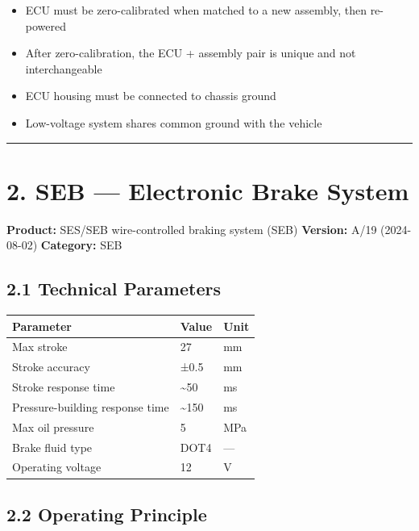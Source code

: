 \documentclass[12pt,a4paper,oneside]{report}
\providecommand{\tightlist}{\setlength{\itemsep}{0pt}\setlength{\parskip}{0pt}}
\begin{document}
\begin{itemize}
\tightlist
\item
  ECU must be zero-calibrated when matched to a new assembly, then re-powered
\item
  After zero-calibration, the ECU + assembly pair is unique and not
  interchangeable
\item
  ECU housing must be connected to chassis ground
\item
  Low-voltage system shares common ground with the vehicle
\end{itemize}

\begin{center}\rule{0.5\linewidth}{0.5pt}\end{center}

\section{2. SEB --- Electronic Brake System}\label{seb-electronic-brake-system}

\textbf{Product:} SES/SEB wire-controlled braking system (SEB) \textbf{Version:}
A/19 (2024-08-02) \textbf{Category:} SEB

\subsection{2.1 Technical Parameters}\label{technical-parameters-1}

\begin{longtable}[]{@{}lll@{}}
\toprule\noalign{}
Parameter & Value & Unit \\
\midrule\noalign{}
\endhead
\bottomrule\noalign{}
\endlastfoot
Max stroke & 27 & mm \\
Stroke accuracy & ±0.5 & mm \\
Stroke response time & \textasciitilde50 & ms \\
Pressure-building response time & \textasciitilde150 & ms \\
Max oil pressure & 5 & MPa \\
Brake fluid type & DOT4 & --- \\
Operating voltage & 12 & V \\
\end{longtable}

\subsection{2.2 Operating Principle}\label{operating-principle-1}
\end{document}
